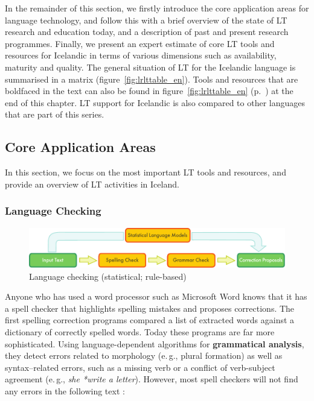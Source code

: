 \documentclass{../../metanetpaper}
\begin{document}
\begin{multicols}{2}
In the remainder of this section, we firstly introduce the core application areas for language technology, and follow this with a brief overview of the state of LT research and education today, and a description of past and present research programmes. Finally, we present an expert estimate of core LT tools and resources for Icelandic in terms of various dimensions such as availability, maturity and quality. The general situation of LT for the Icelandic language is summarised in a matrix (figure~\ref{fig:lrlttable_en}). Tools and resources that are boldfaced in the text can also be found in figure~\ref{fig:lrlttable_en} (p.~\pageref{fig:lrlttable_en}) at the end of this chapter. LT support for Icelandic is also compared to other languages that are part of this series.

\subsection{Core Application Areas}

In this section, we focus on the most important LT tools and resources, and provide an overview of LT activities in Iceland. 

\subsubsection{Language Checking}

\begin{figure}[t]
  \center
  \includegraphics[width=\textwidth]{../_media/english/language_checking}
  \caption{Language checking (statistical; rule-based)}
  \label{fig:langcheckingaarch_en}
\end{figure}

Anyone who has used a word processor such as Microsoft Word knows that it has a spell checker that highlights spelling mistakes and proposes corrections. The first spelling correction programs compared a list of extracted words against a dictionary of correctly spelled words. Today these programs are far more sophisticated. Using language-dependent algorithms for \textbf{grammatical analysis}, they detect errors related to morphology (e.\,g., plural formation) as well as syntax--related errors, such as a missing verb or a conflict of verb-subject agreement (e.\,g., \textit{she *write a letter}). However, most spell checkers will not find any errors in the following text \cite{zar1}:


\end{multicols}
\end{document}
